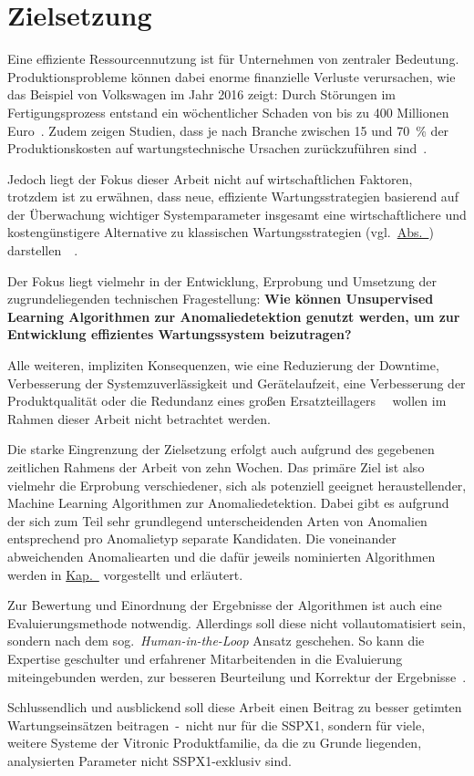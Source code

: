 \chapter{Zielsetzung}\label{ch:zielsetzung}
Eine effiziente Ressourcennutzung ist für Unternehmen von zentraler Bedeutung. Produktionsprobleme können dabei enorme finanzielle
Verluste verursachen, wie das Beispiel von Volkswagen im Jahr 2016 zeigt: Durch Störungen im Fertigungsprozess entstand ein wöchentlicher
Schaden von bis zu 400 Millionen Euro~\cite{Krupitzer2020}. Zudem zeigen Studien, dass je nach Branche zwischen 15 und 70~\% der
Produktionskosten auf wartungstechnische Ursachen zurückzuführen sind~\cite{Bevilacqua2000}.

Jedoch liegt der Fokus dieser Arbeit nicht auf wirtschaftlichen Faktoren, trotzdem ist zu erwähnen, dass neue, effiziente
Wartungsstrategien basierend auf der Überwachung wichtiger Systemparameter insgesamt eine wirtschaftlichere und kostengünstigere
Alternative zu klassischen Wartungsstrategien (vgl.~\hyperref[sec:trad_maintenance]{Abs.~})
darstellen~\cite{Deloux2009}~\Cite[S.~64--65]{Mobley2002}.

Der Fokus liegt vielmehr in der Entwicklung, Erprobung und Umsetzung der zugrundeliegenden technischen Fragestellung: \textbf{Wie können
Unsupervised Learning Algorithmen zur Anomaliedetektion genutzt werden, um zur Entwicklung effizientes Wartungssystem beizutragen?}

Alle weiteren, impliziten Konsequenzen, wie eine Reduzierung der Downtime, Verbesserung der Systemzuverlässigkeit
und Gerätelaufzeit, eine Verbesserung der Produktqualität oder die Redundanz eines großen
Ersatzteillagers~\cite[S.~61--62]{Mobley2002}~\Cite[S.~5]{Scheffer2004} wollen im Rahmen dieser Arbeit nicht betrachtet werden.

Die starke Eingrenzung der Zielsetzung erfolgt auch aufgrund des gegebenen zeitlichen Rahmens der Arbeit von zehn Wochen. Das primäre
Ziel ist also vielmehr die Erprobung verschiedener, sich als potenziell geeignet heraustellender, Machine Learning Algorithmen zur
Anomaliedetektion. Dabei gibt es aufgrund der sich zum Teil sehr grundlegend unterscheidenden Arten von Anomalien entsprechend pro
Anomalietyp separate Kandidaten. Die voneinander abweichenden Anomaliearten und die dafür jeweils nominierten Algorithmen werden in
\hyperref[ch:anomaliedetektion]{Kap.~} vorgestellt und erläutert.

Zur Bewertung und Einordnung der Ergebnisse der Algorithmen ist auch eine Evaluierungsmethode notwendig. Allerdings soll diese nicht
vollautomatisiert sein, sondern nach dem sog.~\textit{Human-in-the-Loop} Ansatz geschehen. So kann die Expertise geschulter und
erfahrener Mitarbeitenden in die Evaluierung miteingebunden werden, zur besseren Beurteilung und Korrektur der Ergebnisse~\cite{Deng2024}.

Schlussendlich und ausblickend soll diese Arbeit einen Beitrag zu besser getimten Wartungseinsätzen beitragen~-~nicht nur für die SSPX1,
sondern für viele, weitere Systeme der Vitronic Produktfamilie, da die zu Grunde liegenden, analysierten Parameter nicht SSPX1-exklusiv
sind.